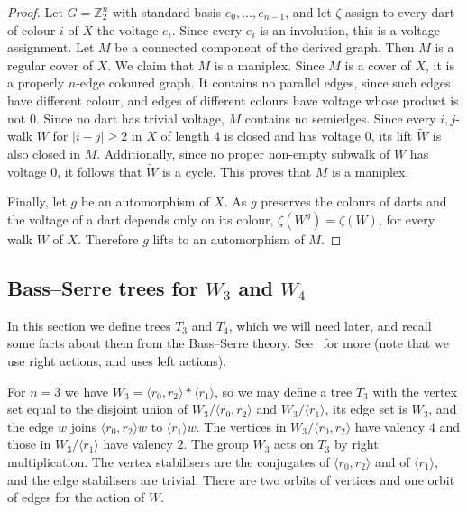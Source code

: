 \documentclass{amsart}
\theoremstyle{plain}
\theoremstyle{definition}
\theoremstyle{remark}
\newcommand{\ZZ}{\mathbb{Z}}
\begin{document}
\begin{proof}
	Let $G=\ZZ_2^n$ with standard basis $e_0,\dots,e_{n-1}$, and let $\zeta$ assign to every
	dart of colour $i$ of $X$ the voltage $e_i$. Since every $e_i$ is an involution, this is
	a voltage assignment. Let $M$ 
be a connected component of the derived graph. Then $M$ is a regular cover of $X$. We claim that $M$ is a maniplex. Since $M$ is a cover of 
  $X$, it is a properly $n$-edge coloured graph. It contains no parallel edges,
  since such edges have different colour, and edges of different colours have
  voltage whose product is not $0$. Since no dart has trivial voltage, $M$ contains no semiedges. Since every $i,j$-walk $W$ for $|i-j|\ge2$ in $X$ of length $4$
  is closed and has voltage $0$, its lift $\tilde W$ is also closed in $M$. Additionally, since
  no proper non-empty subwalk of $W$ has voltage $0$, it follows that $\tilde W$ is a cycle. This proves that $M$ is a maniplex.

	Finally, let $g$ be an automorphism of $X$. As $g$ preserves the colours of
	darts and the voltage of a dart depends only on its colour, $\zeta(W^g)=\zeta(W)$, for
	every walk $W$ of $X$. Therefore $g$ lifts to an automorphism of $M$.
\end{proof}

\subsection{Bass--Serre trees for $W_3$ and $W_4$}\label{sec:tree}

In this section we define trees $T_3$ and $T_4$, which we will need later, and recall some facts about them from the Bass--Serre theory.
See~\cite{Serre1980} for more (note that we use right actions, and
\cite{Serre1980} uses left actions). 

For $n=3$ we have $W_3=\langle r_0,r_2\rangle*\langle r_1\rangle$, so we may define a tree $T_3$ with
the vertex set equal
to the disjoint union of $W_3/\langle r_0,r_2\rangle$ and $W_3/\langle r_1\rangle$, its
edge set is $W_3$, and the edge $w$ joins $\langle r_0,r_2\rangle w$ to
$\langle r_1\rangle w$. The vertices in $W_3/\langle r_0,r_2\rangle$ have valency $4$ and
those in $W_3/\langle r_1\rangle$ have valency $2$. The group $W_3$ acts on $T_3$ by right
multiplication. The vertex stabilisers are the
conjugates of $\langle r_0,r_2\rangle$ and of $\langle r_1\rangle$, and the edge
stabilisers are trivial. There are two orbits of vertices and one orbit of edges for the action of $W$.
\end{document}
